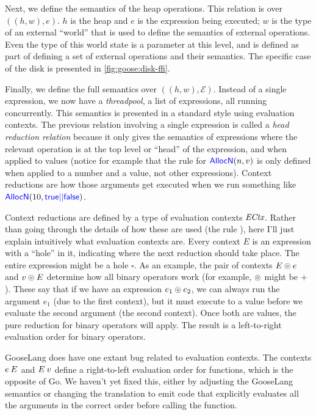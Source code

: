 Next, we define the semantics of the heap operations. This relation is over
$((h, w), e)$. $h$ is the heap and $e$ is the expression being executed; $w$ is
the type of an external ``world'' that is used to define the semantics of
external operations. Even the type of this world state is a parameter at this
level, and is defined as part of defining a set of external operations and their
semantics. The specific case of the disk is presented in
\cref{fig:goose:disk-ffi}.

Finally, we define the full semantics over $((h, w), \mathcal{E})$. Instead of a
single expression, we now have a \emph{threadpool}, a list of expressions, all
running concurrently. This semantics is presented in a standard style using
evaluation contexts. The previous relation involving a single expression
is called a \emph{head reduction relation} because it only gives the semantics
of expressions where the relevant operation is at the top level or ``head'' of
the expression, and when applied to values (notice for example that the rule for
$\mathsf{\textcolor{blue}{AllocN}}(n, v)$ is only defined when applied to a number and a value,
not other expressions). Context reductions are how those arguments get executed
when we run something like $\mathsf{\textcolor{blue}{AllocN}}(10, \mathsf{\textcolor{blue}{true || false}})$.

Context reductions are defined by a type of evaluation contexts
$\textit{ECtx}$. Rather than going through the details of how these are used
(the rule ), here I'll just explain intuitively what
evaluation contexts are. Every context $E$ is an expression with a ``hole'' in
it, indicating where the next reduction should take place. The entire expression
might be a hole $\square$. As an example, the pair of contexts $E \circledcirc e$ and
$v \circledcirc E$ determine how all binary operators work (for example, $\circledcirc$
might be $+$). These say that if we have an expression $e_{1} \circledcirc e_{2}$, we can
always run the argument $e_{1}$ (due to the first context), but it must execute
to a value before we evaluate the second argument (the second context). Once
both are values, the pure reduction for binary operators will apply. The result
is a left-to-right evaluation order for binary operators.

GooseLang does have one extant bug related to evaluation contexts. The contexts
$e \: E$ and $E \: v$ define a right-to-left evaluation order for functions,
which is the opposite of Go. We haven't yet fixed this, either by adjusting the
GooseLang semantics or changing the translation to emit code that explicitly
evaluates all the arguments in the correct order before calling the function.

